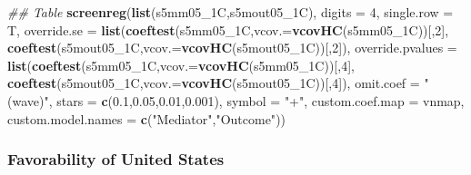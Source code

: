 \documentclass[
]{article}
\newenvironment{Shaded}{\begin{snugshade}}{\end{snugshade}}
\newcommand{\CommentTok}[1]{\textcolor[rgb]{0.56,0.35,0.01}{\textit{#1}}}
\newcommand{\DataTypeTok}[1]{\textcolor[rgb]{0.13,0.29,0.53}{#1}}
\newcommand{\DecValTok}[1]{\textcolor[rgb]{0.00,0.00,0.81}{#1}}
\newcommand{\FloatTok}[1]{\textcolor[rgb]{0.00,0.00,0.81}{#1}}
\newcommand{\KeywordTok}[1]{\textcolor[rgb]{0.13,0.29,0.53}{\textbf{#1}}}
\newcommand{\NormalTok}[1]{#1}
\newcommand{\StringTok}[1]{\textcolor[rgb]{0.31,0.60,0.02}{#1}}
\begin{document}
\begin{Shaded}
\begin{Highlighting}[]
\CommentTok{## Table}
\KeywordTok{screenreg}\NormalTok{(}\KeywordTok{list}\NormalTok{(s5mm05_1C,s5mout05_1C), }\DataTypeTok{digits =} \DecValTok{4}\NormalTok{, }\DataTypeTok{single.row =}\NormalTok{ T,}
          \DataTypeTok{override.se =} \KeywordTok{list}\NormalTok{(}\KeywordTok{coeftest}\NormalTok{(s5mm05_1C,}\DataTypeTok{vcov.=}\KeywordTok{vcovHC}\NormalTok{(s5mm05_1C))[,}\DecValTok{2}\NormalTok{],}
                             \KeywordTok{coeftest}\NormalTok{(s5mout05_1C,}\DataTypeTok{vcov.=}\KeywordTok{vcovHC}\NormalTok{(s5mout05_1C))[,}\DecValTok{2}\NormalTok{]),}
          \DataTypeTok{override.pvalues =} \KeywordTok{list}\NormalTok{(}\KeywordTok{coeftest}\NormalTok{(s5mm05_1C,}\DataTypeTok{vcov.=}\KeywordTok{vcovHC}\NormalTok{(s5mm05_1C))[,}\DecValTok{4}\NormalTok{],}
                                  \KeywordTok{coeftest}\NormalTok{(s5mout05_1C,}\DataTypeTok{vcov.=}\KeywordTok{vcovHC}\NormalTok{(s5mout05_1C))[,}\DecValTok{4}\NormalTok{]),}
          \DataTypeTok{omit.coef =} \StringTok{"(wave)"}\NormalTok{, }\DataTypeTok{stars =} \KeywordTok{c}\NormalTok{(}\FloatTok{0.1}\NormalTok{,}\FloatTok{0.05}\NormalTok{,}\FloatTok{0.01}\NormalTok{,}\FloatTok{0.001}\NormalTok{), }\DataTypeTok{symbol =} \StringTok{"+"}\NormalTok{,}
          \DataTypeTok{custom.coef.map =}\NormalTok{ vnmap, }
          \DataTypeTok{custom.model.names =} \KeywordTok{c}\NormalTok{(}\StringTok{"Mediator"}\NormalTok{,}\StringTok{"Outcome"}\NormalTok{))}
\end{Highlighting}
\end{Shaded}

\hypertarget{favorability-of-united-states}{%
\subsubsection{Favorability of United
States}\label{favorability-of-united-states}}
\end{document}
